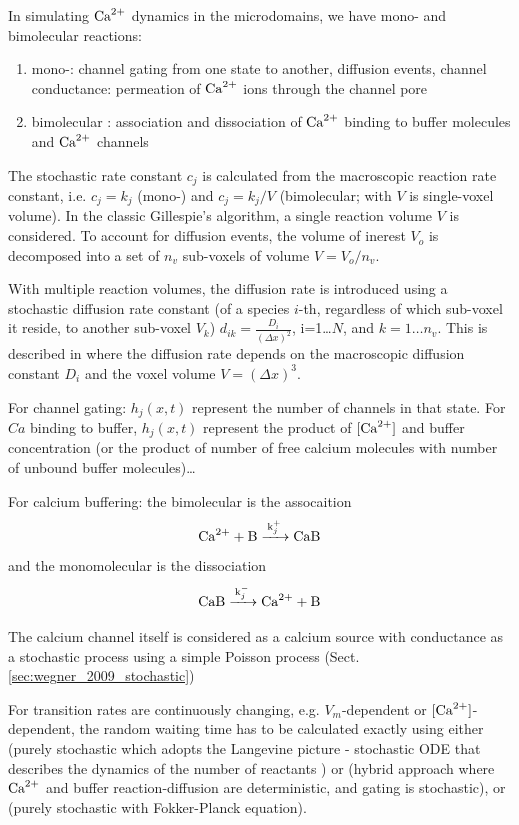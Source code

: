 \begin{framed}
In simulating ${\text{Ca}^{2+}}$ dynamics in the microdomains, we have mono- and bimolecular
reactions:
\begin{enumerate}
  \item mono-: channel gating from one state to another, diffusion events,
  channel conductance: permeation of ${\text{Ca}^{2+}}$ ions through the  channel pore
  
  \item bimolecular : association and dissociation of ${\text{Ca}^{2+}}$ binding to
  buffer molecules and ${\text{Ca}^{2+}}$ channels 
\end{enumerate}

The stochastic rate constant $c_j$ is calculated from the macroscopic reaction
rate constant, i.e. $c_j=k_j$ (mono-) and $c_j=k_j/V$ (bimolecular; with $V$ is
single-voxel volume). In the classic Gillespie's algorithm, a single reaction
volume $V$ is considered. To account for diffusion events, the volume of inerest
$V_o$ is decomposed into a set of $n_v$ sub-voxels of volume $V=V_o/n_v$. 

With multiple reaction volumes, the diffusion rate is introduced using a
stochastic diffusion rate constant (of a species $i$-th, regardless of which
sub-voxel it reside, to another sub-voxel $V_k$) $d_{ik} = \frac{D_i}{(\Delta
x)^2}$, i=1\ldots $N$, and $k=1\ldots n_v$. This is described in \citep{elf2003}
where the diffusion rate depends on the macroscopic diffusion  constant $D_i$
and the voxel volume $V=(\Delta x)^3$. 

For channel gating: $h_j(x,t)$ represent the number of channels in that state.
For $Ca$ binding to buffer, $h_j(x,t)$ represent the product of $[{\text{Ca}^{2+}}]$ and
buffer concentration (or the product of number of free calcium molecules with
number of unbound buffer molecules)\ldots

For calcium buffering: the bimolecular is the assocaition
\begin{equation}
\ce{Ca^2+ + B ->[k^+_j] CaB}
\end{equation}
and the monomolecular is the dissociation
\begin{equation}
\ce{CaB ->[k^-_j] Ca^2+ + B}
\end{equation}

The calcium channel itself is considered as a calcium source
with conductance as a stochastic process using a simple
Poisson process \citep{wegner2009} (Sect.\ref{sec:wegner_2009_stochastic})

For transition rates are continuously changing, e.g. $V_m$-dependent or
$[{\text{Ca}^{2+}}]$-dependent, the random waiting time has to be calculated exactly using
either \citep{wegner2009} (purely stochastic which adopts the Langevine picture
- stochastic ODE that describes the dynamics of the number of reactants
\citep{gillespie2000}) or \citep{alfonsi2005, mazzag2005erca, rudiger2007}
(hybrid approach where ${\text{Ca}^{2+}}$ and buffer reaction-diffusion are deterministic,
and gating is stochastic), or \citep{winslow2006} (purely stochastic with 
Fokker-Planck equation). 

\end{framed}

